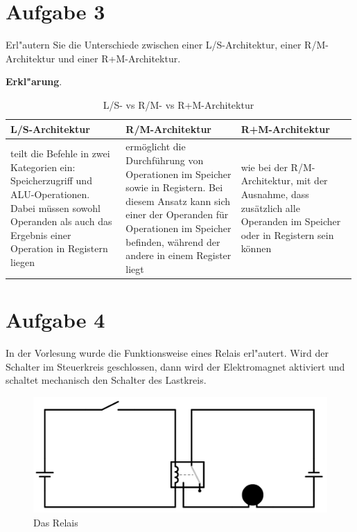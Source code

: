\documentclass[10pt, a4paper, oneside]{article}
\begin{document}
\section{Aufgabe 3}

Erl"autern Sie die Unterschiede zwischen einer L/S-Architektur, einer
R/M-Architektur und einer R+M-Architektur.

\textbf{Erkl"arung}.

\begin{table}[h]
    \centering
    \begin{tabular}{p{0.33\linewidth}|p{0.33\linewidth}|p{0.33\linewidth}}
        L/S-Architektur & R/M-Architektur & R+M-Architektur \\
        \hline
        teilt die Befehle in zwei Kategorien ein: Speicherzugriff und
        ALU-Operationen. Dabei müssen sowohl Operanden als auch das Ergebnis
        einer Operation in Registern liegen &
        ermöglicht die Durchführung von Operationen im Speicher sowie in
        Registern. Bei diesem Ansatz kann sich einer der Operanden für
        Operationen im Speicher befinden, während der andere in einem Register
        liegt &
        wie bei der R/M-Architektur, mit der Ausnahme, dass zusätzlich alle
        Operanden im Speicher oder in Registern sein können
    \end{tabular}
    \caption{L/S- vs R/M- vs R+M-Architektur}
\end{table}

\section{Aufgabe 4}

In der Vorlesung wurde die Funktionsweise eines Relais erl"autert. Wird der
Schalter im Steuerkreis geschlossen, dann wird der Elektromagnet aktiviert und
schaltet mechanisch den Schalter des Lastkreis.

\begin{figure}[h]
    \includegraphics[width=1\textwidth]{./assets/relay-circuit.png}
    \caption{Das Relais}
\end{figure}
\end{document}

